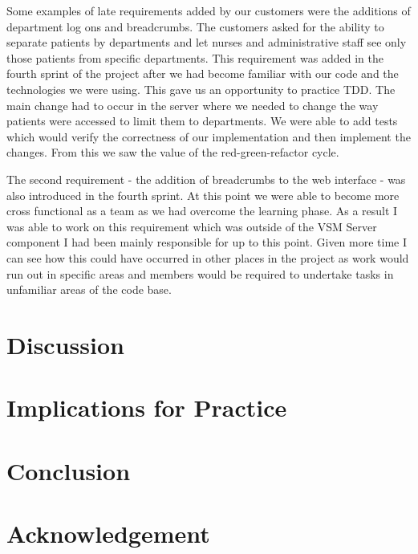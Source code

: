 \documentclass[conference]{IEEEtran}
\begin{document}
Some examples of late requirements added by our customers were the additions of
department log ons and breadcrumbs. The customers asked for the ability to
separate patients by departments and let nurses and administrative staff see
only those patients from specific departments. This requirement was added in the
fourth sprint of the project after we had become familiar with our code and the
technologies we were using. This gave us an opportunity to practice TDD. The
main change had to occur in the server where we needed to change the way
patients were accessed to limit them to departments. We were able to add tests
which would verify the correctness of our implementation and then implement the
changes. From this we saw the value of the red-green-refactor cycle.

The second requirement - the addition of breadcrumbs to the web interface - was
also introduced in the fourth sprint. At this point we were able to become more
cross functional as a team as we had overcome the learning phase. As a result I
was able to work on this requirement which was outside of the VSM Server
component I had been mainly responsible for up to this point. Given more time I
can see how this could have occurred in other places in the project as work
would run out in specific areas and members would be required to undertake tasks
in unfamiliar areas of the code base.


\section{Discussion}


\section{Implications for Practice}


\section{Conclusion}


\section*{Acknowledgement}


\end{document}
